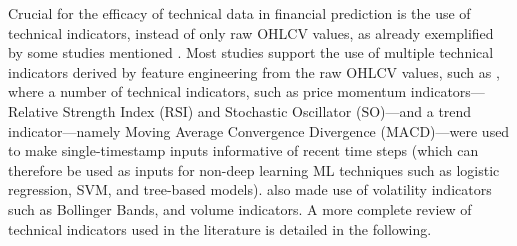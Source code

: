 \documentclass[stu,floatsintext]{apa7}
\begin{document}
Crucial for the efficacy of technical data in financial prediction is the use of technical indicators, instead of only raw OHLCV values, as already exemplified by some studies mentioned \parencite{goluza2024deep,son2012forecasting,huddleston2021intraday}. Most studies support the use of multiple technical indicators derived by feature engineering from the raw OHLCV values, such as \textcite{basak2018predicting}, where a number of technical indicators, such as price momentum indicators—Relative Strength Index ($\text{RSI}$) and Stochastic Oscillator ($\text{SO}$)—and a trend indicator—namely Moving Average Convergence Divergence ($\text{MACD}$)—were used to make single-timestamp inputs informative of recent time steps (which can therefore be used as inputs for non-deep learning ML techniques such as logistic regression, SVM, and tree-based models). \textcite{lohrmann2018classification} also made use of volatility indicators such as Bollinger Bands, and volume indicators. A more complete review of technical indicators used in the literature is detailed in the following.
\end{document}
